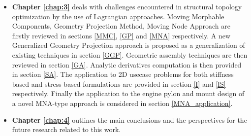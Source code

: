 \begin{itemize}
\item \textbf{Chapter \ref{chap:3}} deals with challenges encountered in structural topology optimization by the use of Lagrangian approaches. Moving Morphable Components, Geometry Projection Method, Moving Node Approach are firstly reviewed in sections \ref{MMC}, \ref{GP} and \ref{MNA} respectively. A new Generalized Geometry Projection approach is proposed as a generalization of existing techniques in section \ref{GGP}. Geometric assembly techniques are then reviewed in section \ref{GA}. Analytic derivatives computation is then provided in section \ref{SA}. The application to 2D usecase problems for both stiffness based and stress based formulations are provided in section \ref{I} and \ref{IS} respectively. Finally the application to the  engine pylon and mount design of a novel MNA-type approach is considered in section \ref{MNA_application}. 
\item \textbf{Chapter \ref{chap:4}}  outlines the main conclusions and the perspectives for the future research related to this work.
\end{itemize}

